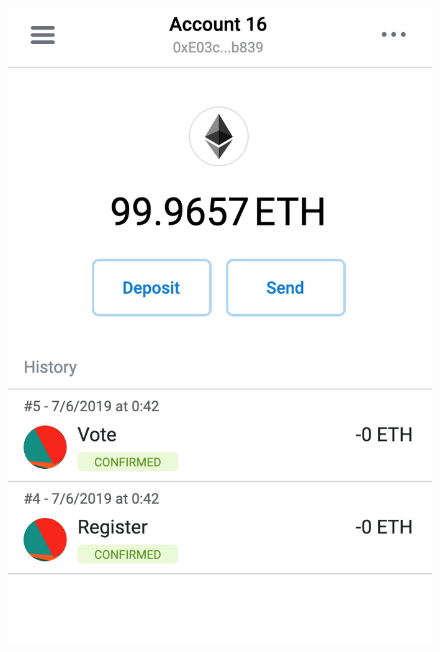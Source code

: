 	\begin{figure}
		\centering
		\includegraphics[width=\linewidth/3]{img/screen_metamask6.png}

\end{figure}
